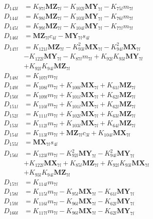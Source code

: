 \begin{align}
D_{143l} &= K_{97l}\mathbf{MZ}_{7l} - K_{102l}\mathbf{MY}_{7l} - K_{75l}m_{7l} \nonumber \\
D_{144l} &= K_{98l}\mathbf{MZ}_{7l} - K_{103l}\mathbf{MY}_{7l} - K_{76l}m_{7l} \nonumber \\
D_{145l} &= K_{99l}\mathbf{MZ}_{7l} - K_{104l}\mathbf{MY}_{7l} - K_{77l}m_{7l} \nonumber \\
D_{146l} &= \mathbf{MZ}_{7l}c_{4l} - \mathbf{MY}_{7l}s_{4l} \nonumber \\
D_{147l} &= K_{121l}\mathbf{MZ}_{7l} - K_{93l}^2\mathbf{MX}_{7l} - K_{94l}^2\mathbf{MX}_{7l}  \nonumber \\
&- K_{122l}\mathbf{MY}_{7l} - K_{87l}m_{7l} + K_{92l}K_{93l}\mathbf{MY}_{7l}  \nonumber \\
&+ K_{92l}K_{94l}\mathbf{MZ}_{7l} \nonumber \\
D_{148l} &= K_{107l}m_{7l} \nonumber \\
D_{149l} &= K_{108l}m_{7l} + K_{100l}\mathbf{MX}_{7l} + K_{61l}\mathbf{MZ}_{7l} \nonumber \\
D_{150l} &= K_{109l}m_{7l} + K_{101l}\mathbf{MX}_{7l} + K_{62l}\mathbf{MZ}_{7l} \nonumber \\
D_{151l} &= K_{110l}m_{7l} + K_{101l}\mathbf{MX}_{7l} + K_{62l}\mathbf{MZ}_{7l} \nonumber \\
D_{152l} &= K_{111l}m_{7l} + K_{102l}\mathbf{MX}_{7l} + K_{63l}\mathbf{MZ}_{7l} \nonumber \\
D_{153l} &= K_{112l}m_{7l} + K_{103l}\mathbf{MX}_{7l} + K_{64l}\mathbf{MZ}_{7l} \nonumber \\
D_{154l} &= K_{113l}m_{7l} + \mathbf{MZ}_{7l}c_{3l} + K_{104l}\mathbf{MX}_{7l} \nonumber \\
D_{155l} &= \mathbf{MX}_{7l}s_{4l} \nonumber \\
D_{156l} &= K_{123l}m_{7l} - K_{92l}^2\mathbf{MY}_{7l} - K_{94l}^2\mathbf{MY}_{7l}  \nonumber \\
&+ K_{122l}\mathbf{MX}_{7l} + K_{85l}\mathbf{MZ}_{7l} + K_{92l}K_{93l}\mathbf{MX}_{7l}  \nonumber \\
&+ K_{93l}K_{94l}\mathbf{MZ}_{7l} \nonumber \\
D_{157l} &= K_{114l}m_{7l} \nonumber \\
D_{158l} &= K_{115l}m_{7l} - K_{95l}\mathbf{MX}_{7l} - K_{61l}\mathbf{MY}_{7l} \nonumber \\
D_{159l} &= K_{116l}m_{7l} - K_{96l}\mathbf{MX}_{7l} - K_{62l}\mathbf{MY}_{7l} \nonumber \\
D_{160l} &= K_{117l}m_{7l} - K_{96l}\mathbf{MX}_{7l} - K_{62l}\mathbf{MY}_{7l} \nonumber \\

\end{align}
